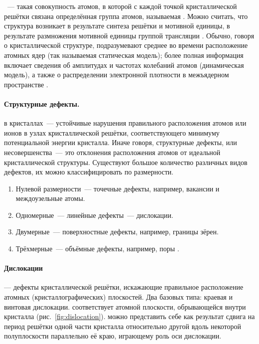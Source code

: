 \documentclass[a4paper, 14pt, titlepage]{extarticle}
\begin{document}
  ~--- такая совокупность атомов, в которой с каждой точкой
  кристаллической решётки связана определённая группа атомов, называемая . Можно считать,
  что структура возникает в результате синтеза решётки и мотивной единицы, в результате размножения
  мотивной единицы группой трансляции \cite{wiki-cryst-struct}.
  Обычно, говоря о кристаллической структуре, подразумевают среднее во времени расположение атомных
  ядер (так называемая статическая модель); более полная информация включает сведения об амплитудах и частотах
  колебаний атомов (динамическая модель), а также о распределении электронной плотности в межъядерном
  пространстве \cite{chemenc-crystall}.

  \paragraph{Структурные дефекты.}  в кристаллах~--- устойчивые нарушения правильного
  расположения атомов или ионов в узлах кристаллической решётки, соответствующего минимуму потенциальной
  энергии кристалла. Иначе говоря, структурные дефекты, или несовершенства~--- это отклонения
  расположения атомов от идеальной кристаллической структуры. Существуют большое количество
  различных видов дефектов, их можно классифицировать по размерности.
  \begin{enumerate}
    \item Нулевой размерности~--- точечные дефекты, например, вакансии и междоузельные атомы.
    \item Одномерные~--- линейные дефекты~--- дислокации.
    \item Двумерные~--- поверхностные дефекты, например, границы зёрен.
    \item Трёхмерные~--- объёмные дефекты, например, поры \cite{matare-defects}.
  \end{enumerate}

  \paragraph{Дислокации}\unskip--- дефекты кристаллической решётки, искажающие правильное расположение
  атомных (кристаллографических) плоскостей. Два базовых типа: краевая и винтовая дислокации.
   соответствует атомной плоскости, обрывающейся внутри кристалла (рис.~\ref{fig:dislocation}).
   можно представить себе как результат сдвига на период решётки одной
  части кристалла относительно другой вдоль некоторой полуплоскости параллельно её краю, играющему
  роль оси дислокации. %
\end{document}
